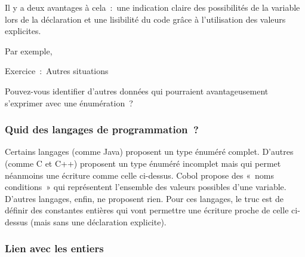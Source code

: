 
			Il y a deux avantages à cela~:~une indication claire des possibilités de
			la variable lors de la déclaration et une lisibilité du code grâce à
			l’utilisation des valeurs explicites.
			
			Par exemple, 
			


			\begin{Emphase}[exercice]{Exercice~:~Autres situations}

				Pouvez-vous identifier d’autres données qui pourraient
				avantageusement s’exprimer avec une énumération~?

			\end{Emphase}
			
			\subsubsection*{Quid des langages de programmation~?}

				Certains langages (comme Java) proposent un type énuméré complet.
				D’autres (comme C et C++) proposent un type énuméré
				incomplet mais qui permet néanmoins une écriture comme celle ci-dessus.
				Cobol propose des «~noms conditions~» qui représentent
				l’ensemble des valeurs possibles
				d’une variable. D’autres langages,
				enfin, ne proposent rien. Pour ces langages, le truc est de définir des
				constantes entières qui vont permettre une écriture proche de celle
				ci-dessus (mais sans une déclaration explicite).

			\subsubsection*{Lien avec les entiers}


